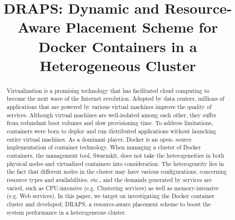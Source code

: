 \documentclass[conference,10pt]{IEEEtran}
\begin{document}
\date{}


\title{\huge DRAPS: Dynamic and Resource-Aware Placement Scheme for Docker Containers in a Heterogeneous Cluster}

\author{
}


\maketitle
\begin{abstract}
Virtualization is a promising technology that has
facilitated cloud computing to become the next wave of the Internet revolution.
Adopted by data centers, millions of applications
that are powered by various virtual machines improve the quality
of services. Although virtual machines are well-isolated among
each other, they suffer from redundant boot volumes and slow
provisioning time. To address limitations, containers were born
to deploy and run distributed applications without launching
entire virtual machines. As a dominant player, Docker is an open-
source implementation of container technology. When managing
a cluster of Docker containers, the management tool, Swarmkit,
does not take the heterogeneities in both physical nodes and
virtualized containers into consideration. The heterogeneity lies
in the fact that different nodes in the cluster may have various
configurations, concerning resource types and availabilities, etc., and the demands
generated by services are varied, such as CPU-intensive (e.g.
Clustering services) as well as memory-intensive (e.g. Web services). In this
paper, we target on investigating the Docker container cluster
and developed, DRAPS, a resource-aware placement scheme to
boost the system performance in a heterogeneous cluster.
\end{abstract}











\end{document}

